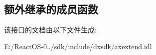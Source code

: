 \subsection*{额外继承的成员函数}


该接口的文档由以下文件生成\+:\begin{DoxyCompactItemize}
\item 
E\+:/\+React\+O\+S-\/0../sdk/include/dxsdk/axextend.\+idl\end{DoxyCompactItemize}
